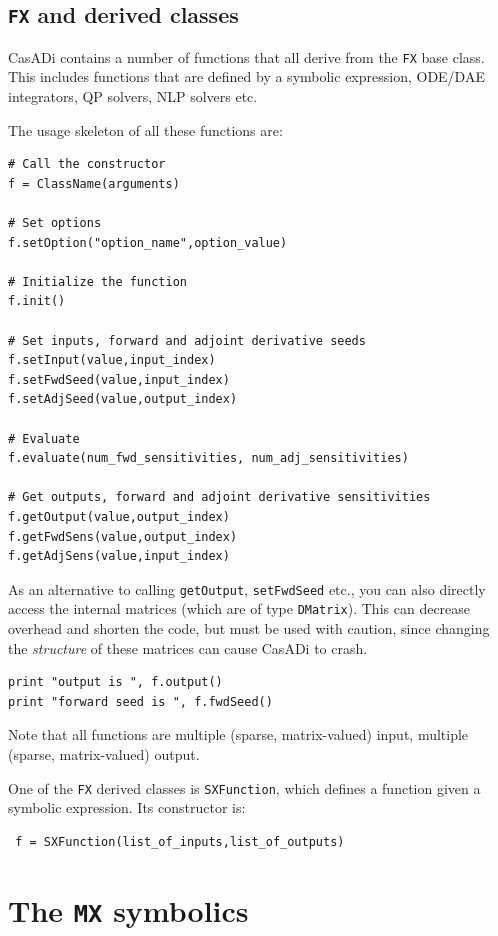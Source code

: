\documentclass[a4paper,12pt]{book}
\begin{document}
{\subsection{\texttt{FX} and derived classes}
CasADi contains a number of functions that all derive from the \texttt{FX} base class. This includes functions that are defined by a symbolic expression, ODE/DAE integrators, QP solvers, NLP solvers etc.

The usage skeleton of all these functions are:
\begin{verbatim}
# Call the constructor
f = ClassName(arguments)

# Set options
f.setOption("option_name",option_value)

# Initialize the function
f.init()

# Set inputs, forward and adjoint derivative seeds
f.setInput(value,input_index)
f.setFwdSeed(value,input_index)
f.setAdjSeed(value,output_index)

# Evaluate
f.evaluate(num_fwd_sensitivities, num_adj_sensitivities)

# Get outputs, forward and adjoint derivative sensitivities
f.getOutput(value,output_index)
f.getFwdSens(value,output_index)
f.getAdjSens(value,input_index)
\end{verbatim}

As an alternative to calling \texttt{getOutput}, \texttt{setFwdSeed} etc., you can also directly access the internal matrices (which are of type \texttt{DMatrix}). This can decrease overhead and shorten the code, but must be used with caution, since changing the \emph{structure} of these matrices can cause CasADi to crash.
\begin{verbatim}
print "output is ", f.output()
print "forward seed is ", f.fwdSeed()
\end{verbatim}

Note that all functions are multiple (sparse, matrix-valued) input, multiple (sparse, matrix-valued) output.

One of the \texttt{FX} derived classes is \texttt{SXFunction}, which defines a function given a symbolic expression. Its constructor is:
\begin{verbatim}
 f = SXFunction(list_of_inputs,list_of_outputs)
\end{verbatim}

\section{The \texttt{MX} symbolics}

}
\end{document}
